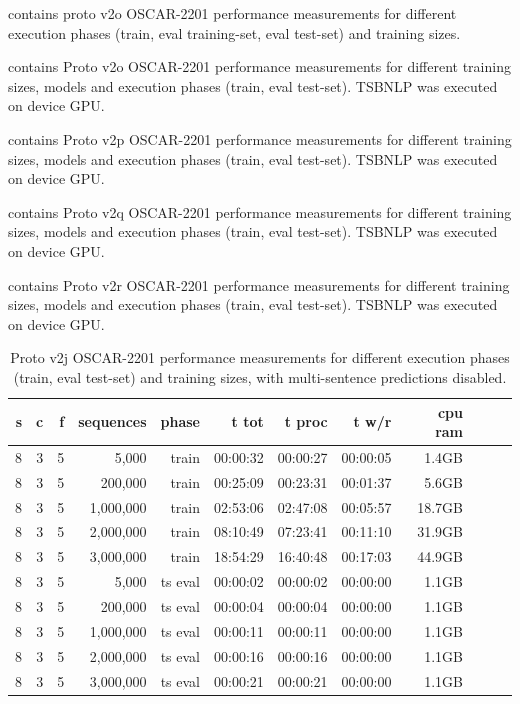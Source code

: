  contains proto v2o OSCAR-2201 performance measurements for different execution phases (train, eval training-set, eval test-set) and training sizes.

 contains Proto v2o OSCAR-2201 performance measurements for different training sizes, models and execution phases (train, eval test-set). TSBNLP was executed on device GPU.

 contains Proto v2p OSCAR-2201 performance measurements for different training sizes, models and execution phases (train, eval test-set). TSBNLP was executed on device GPU.

 contains Proto v2q OSCAR-2201 performance measurements for different training sizes, models and execution phases (train, eval test-set). TSBNLP was executed on device GPU.

 contains Proto v2r OSCAR-2201 performance measurements for different training sizes, models and execution phases (train, eval test-set). TSBNLP was executed on device GPU.

\begin{table}[H]
\centering
\caption{Proto v2j OSCAR-2201 performance measurements for different execution phases (train, eval test-set) and training sizes, with multi-sentence predictions disabled.}
\label{tab:protov2j-oscar-performance}
\begin{tabular}{rrrrrrrrrrrr}
\toprule
\textbf{s} & \textbf{c} & \textbf{f} & \textbf{sequences} & \textbf{phase} & \textbf{t tot} & \textbf{t proc} & \textbf{t w/r} & \textbf{cpu ram} \\
\midrule
8 & 3 & 5 & 5,000       & train   & 00:00:32 & 00:00:27 & 00:00:05 & 1.4GB \\
8 & 3 & 5 & 200,000     & train   & 00:25:09 & 00:23:31 & 00:01:37 & 5.6GB \\
8 & 3 & 5 & 1,000,000   & train   & 02:53:06 & 02:47:08 & 00:05:57 & 18.7GB \\
8 & 3 & 5 & 2,000,000   & train   & 08:10:49 & 07:23:41 & 00:11:10 & 31.9GB \\
8 & 3 & 5 & 3,000,000   & train   & 18:54:29 & 16:40:48 & 00:17:03 & 44.9GB \\
8 & 3 & 5 & 5,000       & ts eval & 00:00:02 & 00:00:02 & 00:00:00 & 1.1GB \\
8 & 3 & 5 & 200,000     & ts eval & 00:00:04 & 00:00:04 & 00:00:00 & 1.1GB \\
8 & 3 & 5 & 1,000,000   & ts eval & 00:00:11 & 00:00:11 & 00:00:00 & 1.1GB \\
8 & 3 & 5 & 2,000,000   & ts eval & 00:00:16 & 00:00:16 & 00:00:00 & 1.1GB \\
8 & 3 & 5 & 3,000,000   & ts eval & 00:00:21 & 00:00:21 & 00:00:00 & 1.1GB \\
\bottomrule
\end{tabular}
\end{table}

